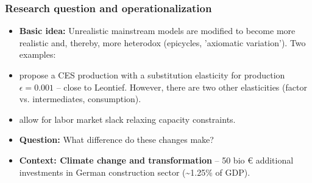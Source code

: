 \documentclass[utf8,aspectratio=169,ngerman,english]{beamer}
\begin{document}
\begin{frame}
\frametitle{Research question and operationalization}
\begin{itemize}
  \item \textbf{Basic idea:} Unrealistic mainstream models are modified to become more realistic and, thereby, more heterodox (epicycles, 'axiomatic variation'). Two examples:
  \item \cite{baqaeeMacroeconomicImpactMicroeconomic2019} propose a CES production with a substitution elasticity for production $\epsilon = 0.001$ -- close to Leontief. However, there are two other elasticities (factor vs. intermediates, consumption).
  \item \cite{baqaeeSupplyDemandDisaggregated2022} allow for labor market slack relaxing capacity constraints.
  \item \textbf{Question:} What difference do these changes make?
  \item \textbf{Context: Climate change and transformation} -- 50 bio € additional investments in German construction sector (\textasciitilde 1.25\% of GDP).
\end{itemize}
\end{frame}


\end{document}
